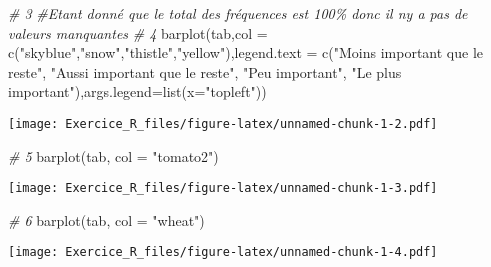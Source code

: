 \documentclass[
]{article}
\newenvironment{Shaded}{\begin{snugshade}}{\end{snugshade}}
\newcommand{\AttributeTok}[1]{\textcolor[rgb]{0.77,0.63,0.00}{#1}}
\newcommand{\CommentTok}[1]{\textcolor[rgb]{0.56,0.35,0.01}{\textit{#1}}}
\newcommand{\FunctionTok}[1]{\textcolor[rgb]{0.00,0.00,0.00}{#1}}
\newcommand{\NormalTok}[1]{#1}
\newcommand{\StringTok}[1]{\textcolor[rgb]{0.31,0.60,0.02}{#1}}
\begin{document}
\begin{Shaded}
\begin{Highlighting}[]
\CommentTok{\# 3}
\CommentTok{\#Etant donné que le total des fréquences  est 100\% donc il n\textquotesingle{}y a pas de valeurs manquantes}
\CommentTok{\# 4}
\FunctionTok{barplot}\NormalTok{(tab,}\AttributeTok{col =} \FunctionTok{c}\NormalTok{(}\StringTok{"skyblue"}\NormalTok{,}\StringTok{"snow"}\NormalTok{,}\StringTok{"thistle"}\NormalTok{,}\StringTok{"yellow"}\NormalTok{),}\AttributeTok{legend.text =} \FunctionTok{c}\NormalTok{(}\StringTok{"Moins important que le reste"}\NormalTok{, }\StringTok{"Aussi important que le reste"}\NormalTok{, }\StringTok{"Peu important"}\NormalTok{, }\StringTok{"Le plus important"}\NormalTok{),}\AttributeTok{args.legend=}\FunctionTok{list}\NormalTok{(}\AttributeTok{x=}\StringTok{"topleft"}\NormalTok{)) }
\end{Highlighting}
\end{Shaded}

\texttt{[image: Exercice\_R\_files/figure-latex/unnamed-chunk-1-2.pdf]}

\begin{Shaded}
\begin{Highlighting}[]
\CommentTok{\# 5}
\FunctionTok{barplot}\NormalTok{(tab, }\AttributeTok{col =} \StringTok{"tomato2"}\NormalTok{)}
\end{Highlighting}
\end{Shaded}

\texttt{[image: Exercice\_R\_files/figure-latex/unnamed-chunk-1-3.pdf]}

\begin{Shaded}
\begin{Highlighting}[]
\CommentTok{\# 6}
\FunctionTok{barplot}\NormalTok{(tab, }\AttributeTok{col =} \StringTok{"wheat"}\NormalTok{)}
\end{Highlighting}
\end{Shaded}

\texttt{[image: Exercice\_R\_files/figure-latex/unnamed-chunk-1-4.pdf]}
\end{document}
